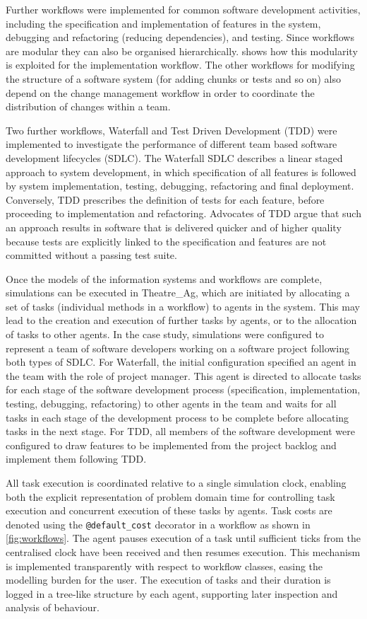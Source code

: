 \documentclass{llncs}
\begin{document}
Further workflows were implemented for common software development activities, including the specification and
implementation of features in the system, debugging and refactoring (reducing dependencies), and testing.  Since
workflows are modular they can also be organised hierarchically.   shows how this modularity is
exploited for the implementation workflow. The other workflows for modifying the structure of a software system (for
adding chunks or tests and so on) also depend on the change management workflow in order to coordinate the distribution
of changes within a team.

Two further workflows, Waterfall and Test Driven Development (TDD) were implemented to investigate the performance of
different team based software development lifecycles (SDLC).  The Waterfall SDLC \citep{benington83production} describes
a linear staged approach to system development, in which specification of all features is followed by system
implementation, testing, debugging, refactoring and final deployment.  Conversely, TDD \citep{beck02test} prescribes the
definition of tests for each feature, before proceeding to implementation and refactoring.  Advocates of TDD argue that
such an approach results in software that is delivered quicker and of higher quality because tests are explicitly linked
to the specification and features are not committed without a passing test suite.

Once the models of the information systems and workflows are complete, simulations can be executed in Theatre\_Ag, which
are initiated by allocating a set of tasks (individual methods in a workflow) to agents in the system. This may
lead to the creation and execution of further tasks by agents, or to the allocation of tasks to other agents.  In the
case study, simulations were configured to represent a team of software developers working on a software project
following both types of SDLC.  For Waterfall, the initial configuration specified an agent in the team with the role of
project manager.  This agent is directed to allocate tasks for each stage of the software development process
(specification, implementation, testing, debugging, refactoring) to other agents in the team and waits for all tasks in
each stage of the development process to be complete before allocating tasks in the next stage.  For TDD, all members of
the software development were configured to draw features to be implemented from the project backlog and implement them
following TDD.

All task execution is coordinated relative to a single simulation clock, enabling both the explicit representation of
problem domain time for controlling task execution and concurrent execution of these tasks by agents.  Task costs are
denoted using the \lstinline!@default_cost! decorator in a workflow as shown in \cref{fig:workflows}.  The agent pauses
execution of a task until sufficient ticks from the centralised clock have been received and then resumes execution.
This mechanism is implemented transparently with respect to workflow classes, easing the modelling burden for the user.
The execution of tasks and their duration is logged in a tree-like structure by each agent, supporting later inspection
and analysis of behaviour.
\end{document}
